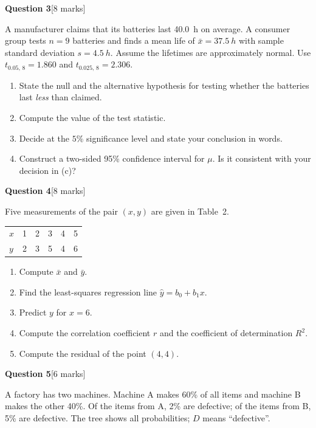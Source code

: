 \documentclass[11pt,a4paper]{article}
\newcommand{\question}[2]{\bigskip\par\noindent\textbf{Question #1}\hfill[#2 marks]\par\nopagebreak\smallskip}
\begin{document}
\question{3}{8}
A manufacturer claims that its batteries last \qty{40.0}{h} on average. A consumer group tests
$n = 9$ batteries and finds a mean life of $\bar{x} = \qty{37.5}{h}$ with sample standard deviation
$s = \qty{4.5}{h}$. Assume the lifetimes are approximately normal. Use $t_{0.05,\,8} = 1.860$ and
$t_{0.025,\,8} = 2.306$.
\begin{enumerate}
  \item State the null and the alternative hypothesis for testing whether the batteries last
        \emph{less} than claimed.
  \item Compute the value of the test statistic.
  \item Decide at the $5\%$ significance level and state your conclusion in words.
  \item Construct a two-sided 95\% confidence interval for $\mu$. Is it consistent with your decision in (c)?
\end{enumerate}

\question{4}{8}
Five measurements of the pair $(x, y)$ are given in Table~2.

\begin{center}
\begin{tabular}{lccccc}
\toprule
$x$ & 1 & 2 & 3 & 4 & 5 \\
$y$ & 2 & 3 & 5 & 4 & 6 \\
\bottomrule
\end{tabular}
\end{center}
\begin{enumerate}
  \item Compute $\bar{x}$ and $\bar{y}$.
  \item Find the least-squares regression line $\hat{y} = b_0 + b_1 x$.
  \item Predict $y$ for $x = 6$.
  \item Compute the correlation coefficient $r$ and the coefficient of determination $R^2$.
  \item Compute the residual of the point $(4, 4)$.
\end{enumerate}

\question{5}{6}
A factory has two machines. Machine A makes 60\% of all items and machine B makes the other 40\%.
Of the items from A, 2\% are defective; of the items from B, 5\% are defective. The tree shows all
probabilities; $D$ means ``defective''.
\end{document}
